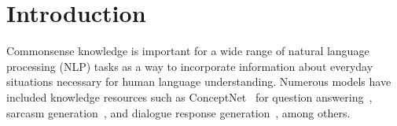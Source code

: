 \section{Introduction}
Commonsense knowledge is important for a wide range of natural language processing (NLP) tasks as a way to incorporate information about everyday situations necessary for human language understanding. Numerous models have included knowledge resources such as ConceptNet~\cite{speer2017conceptnet} for question answering~\cite{lin-etal-2019-kagnet}, sarcasm generation~\cite{chakrabarty-etal-2020-r}, and dialogue response generation~\cite{Zhou2018CCM,zhou-etal-2021-commonsense}, among others. 
